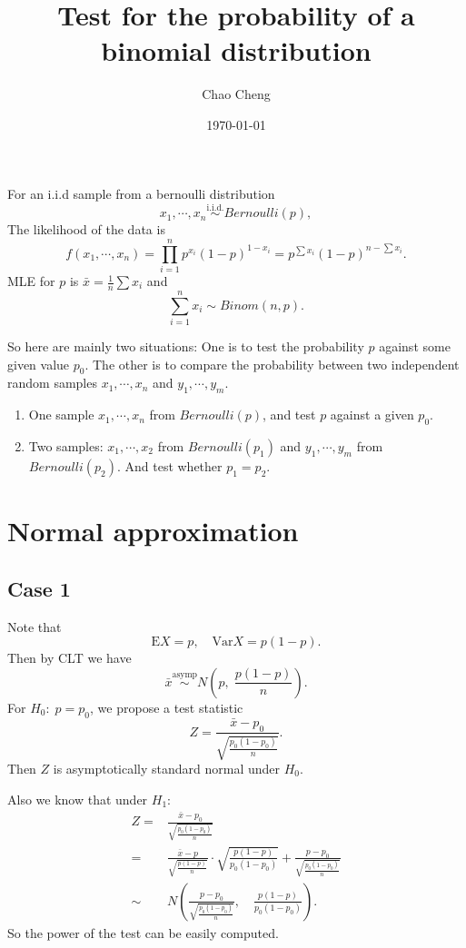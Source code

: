 \documentclass[a4paper,12pt]{article}
\title{Test for the probability of a binomial distribution}
\author{Chao Cheng}
\date{\today}
\begin{document}
\maketitle

\tableofcontents{}

\par

For an i.i.d sample from a bernoulli distribution
\[
  x_1, \cdots, x_n \overset{\mathrm{i.i.d.}}{\sim} Bernoulli(p)
  ,
\]
The likelihood of the data is
\[
  f\left(x_1, \cdots, x_n\right)
  = \prod\limits_{i = 1}^np^{x_i}\left(1 - p\right)^{1 - x_i}
  = p^{\sum x_i}\left(1 - p\right)^{n - \sum x_i}
  .
\]
MLE for $p$ is $\bar{x} = \frac{1}{n}\sum x_i$ and
\[
  \sum\limits_{i = 1}^nx_i \sim Binom(n, p)
  .
\]

So here are mainly two situations: One is to test the probability $p$ against some given value $p_0$. The other is to compare the probability between two independent random samples $x_1, \cdots, x_n$ and $y_1, \cdots, y_m$.
\begin{enumerate}[label = Case\arabic*:]
\item One sample $x_1, \cdots, x_n$ from $Bernoulli(p)$, and test $p$ against a given $p_0$.
\item Two samples: $x_1, \cdots, x_2$ from $Bernoulli(p_1)$ and $y_1, \cdots, y_m$ from $Bernoulli(p_2)$. And test whether $p_1 = p_2$.
\end{enumerate}

\section{Normal approximation}
\label{sec:normal-approximation}

\subsection{Case 1}
\label{sec:case-1}

Note that
\[
  \mathrm{E}X = p,\quad\mathrm{Var}X = p\left(1 - p\right).
\]
Then by CLT we have
\[
  \bar{x} \overset{\mathrm{asymp}}{\sim} N\left(p,\;\frac{p\left(1 - p\right)}{n}\right)
  .
\]
For $H_0:\;p = p_0$, we propose a test statistic
\[
  Z = \frac{\bar{x} - p_0}{\sqrt{\frac{p_0\left(1 - p_0\right)}{n}}}
  .
\]
Then $Z$ is asymptotically standard normal under $H_0$.
\par
Also we know that under $H_1$:
\[
  \begin{aligned}
    Z =& \frac{\bar{x} - p_0}{\sqrt{\frac{p_0\left(1 - p_0\right)}{n}}}    \\
    =& \frac{\bar{x} - p}{\sqrt{\frac{p\left(1 - p\right)}{n}}}
    \cdot \sqrt{\frac{p\left(1 - p\right)}{p_0\left(1 - p_0\right)}}
    + \frac{p - p_0}{\sqrt{\frac{p_0\left(1 - p_0\right)}{n}}}    \\
    \sim& N\left(
      \frac{p - p_0}{\sqrt{\frac{p_0\left(1 - p_0\right)}{n}}}
      ,\quad
      \frac{p\left(1 - p\right)}{p_0\left(1 - p_0\right)}
    \right)
    .
  \end{aligned}
\]
So the power of the test can be easily computed.
\end{document}
